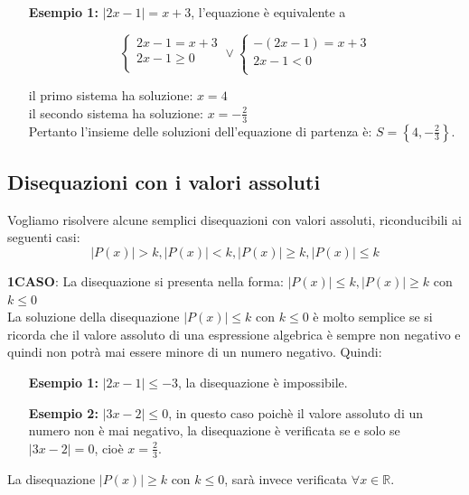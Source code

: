 \begin{enumerate}
        \item [\textbf{Esempio 1:}] $|2x-1|=x+3$, l'equazione è equivalente a
        
        $$
        \left\lbrace 
        \begin{array}{l}
        2x-1=x+3\\
        2x-1\geq 0\\
        \end{array}
        \right.
        \vee
        \left\lbrace 
        \begin{array}{l}
        -(2x-1)=x+3\\
        2x-1< 0\\
        \end{array}
        \right.
        $$
        
il primo sistema ha soluzione: $x=4$\\
il secondo sistema ha soluzione: $x=-\frac{2}{3}$\\
        Pertanto l'insieme delle soluzioni dell'equazione di partenza è: 
$S=\left\lbrace 4,-\frac{2}{3} \right\rbrace $. 
\end{enumerate}

\subsection{Disequazioni con i valori assoluti}
Vogliamo risolvere alcune semplici disequazioni con valori assoluti, 
riconducibili ai seguenti casi:
$$|P(x)|>k, |P(x)|<k, |P(x)|\geq k, |P(x)|\leq k$$


\textbf{1\textdegree CASO}: La disequazione si presenta nella forma:  
$|P(x)|\leq k, |P(x)|\geq k$ con $k\leq 0$\\
La soluzione della disequazione $|P(x)|\leq k$ con $k\leq 0$ è molto semplice 
se 
si ricorda che il valore assoluto di una espressione algebrica è sempre non 
negativo e quindi non potrà mai essere minore di un numero negativo. Quindi:
\begin{enumerate}
        \item [\textbf{Esempio 1:}] $|2x-1|\leq -3$, la disequazione è 
impossibile.
        \item [\textbf{Esempio 2:}] $|3x-2|\leq 0$, in questo caso poichè il 
valore assoluto di un numero non è mai negativo, la disequazione è verificata 
se 
e solo se $|3x-2|=0$, cioè $x=\frac{2}{3}$.     
\end{enumerate}

La disequazione $|P(x)|\geq k$ con $k\leq 0$, sarà invece verificata $\forall x 
\in \mathbb{R}$.

